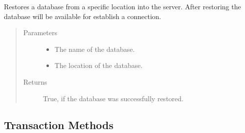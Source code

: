 \documentclass[letterpaper,10pt,english]{sphinxmanual}
\begin{document}
\begin{fulllineitems}
\begin{fulllineitems}
\label{\detokenize{index:secondodb.api.secondoapi.Connection.restore_database}}
Restores a database from a specific location into the  server. After restoring the database will be
available for establish a connection.
\begin{quote}\begin{description}
\item[{Parameters}] \leavevmode\begin{itemize}
\item {} 
 \textendash{} The name of the database.

\item {} 
 \textendash{} The location of the database.

\end{itemize}

\item[{Returns}] \leavevmode
True, if the database was successfully restored.

\end{description}\end{quote}

\end{fulllineitems}


\end{fulllineitems}



\subsection{Transaction Methods}
\label{\detokenize{index:transaction-methods}}
\end{document}

